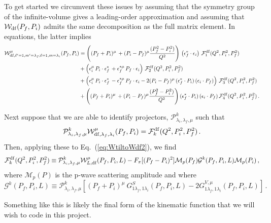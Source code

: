 {To get started we circumvent these issues by assuming that the symmetry group of the infinite-volume gives a leading-order approximation and assuming that $ {\mathcal{W}}_{\rm df}(P_f,P_i) $ admits the same decomposition as the full matrix element. In equations, the latter implies
\begin{align}
 \mathcal W^\mu_{{\rm df},\ell'=1, m'=\lambda_f; \ell=1, m=\lambda_i}(P_f,P_i) 
&=
\left((P_f+P_i)^\mu \,+(P_i-P_f)^\mu\frac{(P_f^2-P_i^2)}{Q^2} \right)\,\left(\epsilon_f^*\cdot \epsilon_i\right)\, \mathcal{F}^{\rm df}_1(Q^2,P_i^2,P_f^2)\,
\nonumber\\&
+\left(\epsilon_i^\mu\, P_i \cdot \epsilon_f^*\,
+\epsilon_f^{*\mu}\, P_f\cdot \epsilon_i\right)\,\mathcal{F}^{\rm df}_2(Q^2,P_i^2,P_f^2)\,
\nonumber\\
&+\left(\epsilon_i^\mu\, P_i\cdot \epsilon_f^*\,-\epsilon_f^{*\mu}\, P_f\cdot \epsilon_i
-2
(P_i-P_f)^\mu \,(\epsilon_f^*\cdot P_i)\,(\epsilon_i\cdot P_f)
\right)
\, \mathcal F^{\rm df}_3(Q^2,P_i^2,P_f^2)
\nonumber\\&
+\left((P_f+P_i)^\mu \,+(P_i-P_f)^\mu\frac{(P_f^2-P_i^2)}{Q^2} \right)(\epsilon_f^*\cdot P_i)\,(\epsilon_i\cdot P_f)\,\mathcal {F}^{\rm df}_4(Q^2,P_i^2,P_f^2) \,.
\end{align}

Next suppose that we are able to identify projectors, $\mathcal P^k_{\lambda_i, \lambda_f, \mu}$ such that
\begin{equation}
\mathcal P^k_{\lambda_i, \lambda_f, \mu}   \mathcal W^\mu_{{\rm df},  \lambda_f, \lambda_i}(P_f,P_i) =  \mathcal{F}^{\rm df}_k(Q^2,P_i^2,P_f^2) \,.
\end{equation}
Then, applying these to Eq.~(\ref{eq:WtiltoWdf2}), we find
\begin{equation}
 \mathcal{F}^{\rm df}_k(Q^2,P_i^2,P_f^2) \equiv \mathcal P^k_{\lambda_i, \lambda_f, \mu}  {\mathcal{W}}_{L,{\rm df}}^\mu(P_f,P_i,L) -  F_\pi[(P_f - P_i)^2] \mathcal  M_{p}(P_f)   \mathcal G^k(P_f,P_i,L)   \mathcal M_{p}(P_i)  \,,
 \end{equation}
 where $\mathcal M_p(P)$ is the p-wave scattering amplitude and where
\begin{equation}
\mathcal G^k(P_f,P_i,L)  \equiv  \mathcal P^k_{\lambda_i, \lambda_f, \mu}  \left [ (P_f + P_i)^\mu  \ G^S_{ 1 \lambda_{f}, 1 \lambda_{i}}(P_f,P_i,L)   - 2 G^{V,\mu}_{1 \lambda_{f},  1 \lambda_{i}}(P_f,P_i,L)    \right ]     \,.
 \end{equation}
 
Something like this is likely the final form of the kinematic function that we will wish to code in this project.

}




